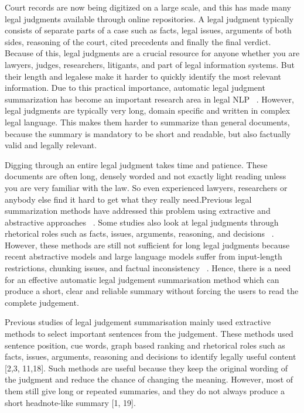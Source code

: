 \documentclass[11pt, a4paper]{article}
\theoremstyle{plain}%
\theoremstyle{remark}%
\theoremstyle{definition}%
\begin{document}
Court records are now being digitized on a large scale, and this has made many legal judgments available through online repositories. A legal judgment typically consists of separate parts of a case such as facts, legal issues, arguments of both sides, reasoning of the court, cited precedents and finally the final verdict. Because of this, legal judgments are a crucial resource for anyone whether you are lawyers, judges, researchers, litigants, and part of legal information systems. But their length and legalese make it harder to quickly identify the most relevant information. Due to this practical importance, automatic legal judgment summarization has become an important research area in legal NLP ~\cite{b1,b2}. However, legal judgments are typically very long, domain specific and written in complex legal language. This makes them harder to summarize than general documents, because the summary is mandatory to be short and readable, but also factually valid and legally relevant.  

Digging through an entire legal judgment takes time and patience. These documents are often long, densely worded and not exactly light reading unless you are very familiar with the law. So even experienced lawyers, researchers or anybody else find it hard to get what they really need.Previous legal summarization methods have addressed this problem using extractive and abstractive approaches ~\cite{b1,b2}. Some studies also look at legal judgments through rhetorical roles such as facts, issues, arguments, reasoning, and decisions ~\cite{b3}. However, these methods are still not sufficient for long legal judgments because recent abstractive models and large language models suffer from input-length restrictions, chunking issues, and factual inconsistency ~\cite{b4, b5}. Hence, there is a need for an effective automatic legal judgement summarisation method which can produce a short, clear and reliable summary without forcing the users to read the complete judgement.

Previous studies of legal judgement summarisation mainly used extractive methods to select important sentences from the judgement. These methods used sentence position, cue words, graph based ranking and rhetorical roles such as facts, issues, arguments, reasoning and decisions to identify legally useful content [2,3, 11,18]. Such methods are useful because they keep the original wording of the judgment and reduce the chance of changing the meaning. However, most of them still give long or repeated summaries, and they do not always produce a short headnote-like summary [1, 19].
\end{document}
